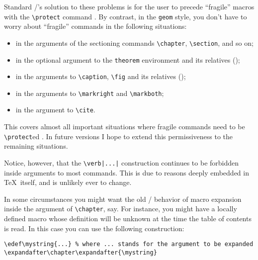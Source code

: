 Standard \latex/'s solution to these problems is for the user to
precede ``fragile'' macros with the \verb+\protect+ command
\cite[33--34]{Lamport}.  By contrast, in the \verb+geom+ style,
you don't have to worry about ``fragile'' commands
in the following situations:
\begin{itemize} 
\item
in the arguments of the sectioning commands
\verb+\chapter+, \verb+\section+, and so on;
\item
in the optional argument to the \verb+theorem+
environment and its relatives ();
\item
in the arguments to \verb+\caption+, \verb+\fig+ and its relatives
(); 
\item
in the arguments to \verb+\markright+ and \verb+\markboth+;
\item
in the argument to \verb+\cite+.
\end{itemize} 
This covers almost all important situations where fragile
commands need to be \verb+\protect+ed \cite[151]{Lamport}.  In future
versions I hope to extend this permissiveness to the remaining
situations.

Notice, however, that the \verb+\verb|...|+ construction continues to
be forbidden inside arguments to most commands.  This is due to
reasons deeply embedded in \TeX\ itself, and is unlikely ever to 
change.

\begin{wizard}
In some circumstances you might want the old \latex/ behavior of
macro expansion inside the argument of \verb+\chapter+, say.
For instance, you might have a locally defined macro whose definition
will be unknown at the time the table of contents is read.
In this case you can use the following construction:
\begin{verbatim}
\edef\mystring{...} % where ... stands for the argument to be expanded
\expandafter\chapter\expandafter{\mystring}
\end{verbatim}
\end{wizard}

